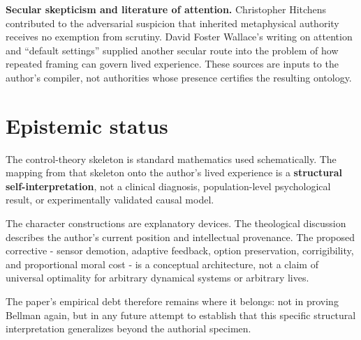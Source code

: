\documentclass[10pt,letterpaper]{article}
\newenvironment{paperbody}
  {\begingroup\justifying}
  {\par\endgroup}
\let\oldsection\section
\renewcommand{\section}{\Needspace{6\baselineskip}\oldsection}
\begin{document}
\begin{paperbody}
\textbf{Secular skepticism and literature of attention.} Christopher
Hitchens contributed to the adversarial suspicion that inherited
metaphysical authority receives no exemption from scrutiny. David Foster
Wallace's writing on attention and ``default settings'' supplied another
secular route into the problem of how repeated framing can govern lived
experience. These sources are inputs to the author's compiler, not
authorities whose presence certifies the resulting ontology.

\section*{Epistemic status}

The control-theory skeleton is standard mathematics used schematically.
The mapping from that skeleton onto the author's lived experience is a
\textbf{structural self-interpretation}, not a clinical diagnosis,
population-level psychological result, or experimentally validated
causal model.

The character constructions are explanatory devices. The theological
discussion describes the author's current position and intellectual
provenance. The proposed corrective - sensor demotion, adaptive
feedback, option preservation, corrigibility, and proportional moral
cost - is a conceptual architecture, not a claim of universal optimality
for arbitrary dynamical systems or arbitrary lives.

The paper's empirical debt therefore remains where it belongs: not in
proving Bellman again, but in any future attempt to establish that this
specific structural interpretation generalizes beyond the authorial
specimen.

\end{paperbody}
\end{document}
